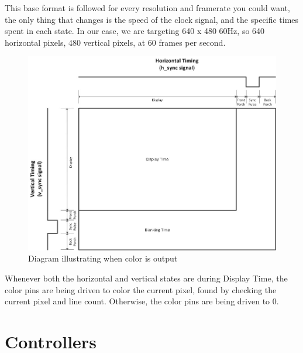 \documentclass[]{article}
\begin{document}
This base format is followed for every resolution and framerate you could want, the only thing that changes is the speed of the clock signal, and the specific times spent in each state.  In our case, we are targeting 640 x 480 60Hz, so 640 horizontal pixels, 480 vertical pixels, at 60 frames per second.
\begin{figure}[H]\centering
    \includegraphics[width=0.75\linewidth]{figures/VGA_Frame_Diagram.jpg}
    \caption{Diagram illustrating when color is output \cite{vgaFrameDiagram}} 
    \label{fig:vgaFrameFigure}
\end{figure}
Whenever both the horizontal and vertical states are during Display Time, the color pins are being driven to color the current pixel, found by checking the current pixel and line count.  Otherwise, the color pins are being driven to 0.
 
\section{Controllers}
\end{document}
